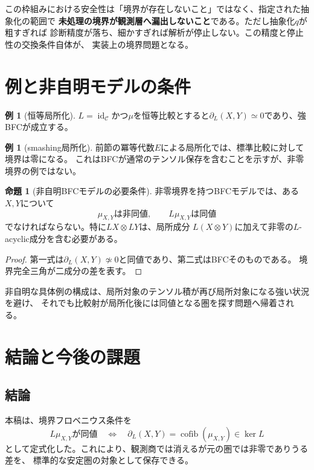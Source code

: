 \documentclass[11pt,a4paper]{ltjsarticle}
\theoremstyle{definition}
\newtheorem{proposition}[definition]{命題}
\newtheorem{example}[definition]{例}
\theoremstyle{remark}
\newcommand{\C}{\mathcal{C}}
\newcommand{\id}{\operatorname{id}}
\newcommand{\cofib}{\operatorname{cofib}}
\newcommand{\Boundary}{\partial_L}
\begin{document}
この枠組みにおける安全性は「境界が存在しないこと」ではなく、指定された抽象化の範囲で
\textbf{未処理の境界が観測層へ漏出しないこと}である。ただし抽象化$q$が粗すぎれば
診断精度が落ち、細かすぎれば解析が停止しない。この精度と停止性の交換条件自体が、
実装上の境界問題となる。

\section{例と非自明モデルの条件}

\begin{example}[恒等局所化]
$L=\id_{\C}$かつ$\mu$を恒等比較とすると$\Boundary(X,Y)\simeq0$であり、強BFCが成立する。
\end{example}

\begin{example}[smashing局所化]
前節の冪等代数$E$による局所化では、標準比較に対して境界は零になる。
これはBFCが通常のテンソル保存を含むことを示すが、非零境界の例ではない。
\end{example}

\begin{proposition}[非自明BFCモデルの必要条件]
非零境界を持つBFCモデルでは、ある$X,Y$について
\[
 \mu_{X,Y}\text{は非同値},
 \qquad
 L\mu_{X,Y}\text{は同値}
\]
でなければならない。特に$LX\otimes LY$は、局所成分
$L(X\otimes Y)$に加えて非零の$L$-acyclic成分を含む必要がある。
\end{proposition}

\begin{proof}
第一式は$\Boundary(X,Y)\not\simeq0$と同値であり、第二式はBFCそのものである。
境界完全三角が二成分の差を表す。
\end{proof}

非自明な具体例の構成は、局所対象のテンソル積が再び局所対象になる強い状況を避け、
それでも比較射が局所化後には同値となる圏を探す問題へ帰着される。

\section{結論と今後の課題}

\subsection{結論}

本稿は、境界フロベニウス条件を
\[
 L\mu_{X,Y}\text{が同値}
 \quad\Longleftrightarrow\quad
 \Boundary(X,Y)=\cofib(\mu_{X,Y})\in\ker L
\]
として定式化した。これにより、観測商では消えるが元の圏では非零でありうる差を、
標準的な安定圏の対象として保存できる。
\end{document}
